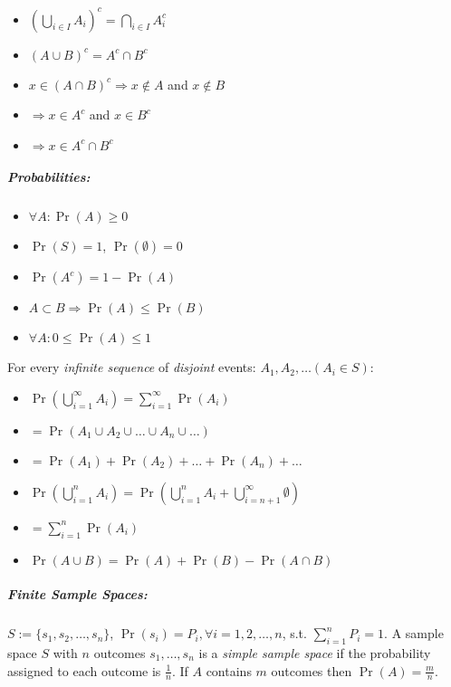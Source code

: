 \documentclass[landscape,10pt]{article}
\begin{document}
\begin{multicols}{4}
        \begin{itemize}[noitemsep]
            \item[] \(\left (\bigcup\limits_{i\in I} A_i \right)^c = \bigcap\limits_{i\in I}A_i^c \)
            \item[] \((A\cup B)^c = A^c \cap B^c \)
            \item[] \(x\in(A\cap B)^c 
            \Rightarrow x \notin A\) and \(x\notin B \)
            \item[] \(\Rightarrow x \in A^c \) and \(x \in B^c \)
            \item[] \(\Rightarrow x \in A^c \cap B^c \)
        \end{itemize}

    \subparagraph*{Probabilities: } 

        \begin{itemize}[noitemsep]
            \item[] \(\forall A: \Pr(A) \geq 0\)
            \item[] \(\Pr(S) = 1\), \(\Pr(\emptyset) = 0\)
            \item[] \(\Pr(A^c) = 1-\Pr(A)\)
            \item[] \(A \subset B \Rightarrow \Pr(A) \leq \Pr(B)\)
            \item[] \(\forall A: 0 \leq \Pr(A) \leq 1\)
        \end{itemize}
        For every \textit{infinite sequence} of \textit{disjoint} events: \( A_1, A_2, \dots (A_i \in S)\):
        \begin{itemize}
            \item[] \(\Pr\left(\bigcup\limits_{i=1}^{\infty}A_i\right) = \sum\limits_{i=1}^{\infty} \Pr(A_i)\)
            \item[] \(=  \Pr(A_1 \cup A_2 \cup \dots \cup A_n \cup \dots)\)
            \item[] \(= \Pr(A_1) + \Pr(A_2) + \dots + \Pr(A_n) + \dots\)
            \item[] \(\Pr(\bigcup\limits_{i=1}^{n}A_i) = \Pr(\bigcup\limits_{i=1}^{n}A_i + \bigcup\limits_{i=n+1}^{\infty}\emptyset) \)
            \item[] \(= \sum\limits_{i=1}^{n}\Pr(A_i)\)
            \item[] \(\Pr(A\cup B) = \Pr(A) + \Pr(B) - \Pr(A\cap B)\)
        \end{itemize}

    \subparagraph*{Finite Sample Spaces: } 
        \(S := \{s_1, s_2, \dots, s_n \}\), \(\Pr(s_i) = P_i, \forall i = 1, 2, \dots, n\), s.t. \(\sum\limits_{i=1}^{n}P_i = 1\). A sample space \(S\) with \(n\) outcomes \(s_1, \ldots, s_n\) is a \textit{simple sample space} if the probability assigned to each outcome is \(\frac{1}{n}\). If \(A\) contains \(m\) outcomes then \(\Pr(A) = \frac{m}{n}\).


\end{multicols}
\end{document}
